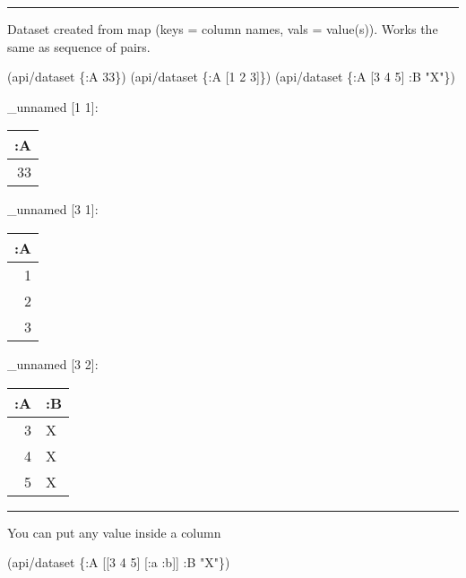 \documentclass[]{article}
\newenvironment{Shaded}{\begin{snugshade}}{\end{snugshade}}
\newcommand{\DecValTok}[1]{\textcolor[rgb]{0.00,0.00,0.81}{#1}}
\newcommand{\StringTok}[1]{\textcolor[rgb]{0.31,0.60,0.02}{#1}}
\newcommand{\AttributeTok}[1]{\textcolor[rgb]{0.77,0.63,0.00}{#1}}
\newcommand{\NormalTok}[1]{#1}
\begin{document}
\begin{center}\rule{0.5\linewidth}{0.5pt}\end{center}

Dataset created from map (keys = column names, vals = value(s)). Works
the same as sequence of pairs.

\begin{Shaded}
\begin{Highlighting}[]
\NormalTok{(api/dataset \{}\AttributeTok{:A} \DecValTok{33}\NormalTok{\})}
\NormalTok{(api/dataset \{}\AttributeTok{:A}\NormalTok{ [}\DecValTok{1} \DecValTok{2} \DecValTok{3}\NormalTok{]\})}
\NormalTok{(api/dataset \{}\AttributeTok{:A}\NormalTok{ [}\DecValTok{3} \DecValTok{4} \DecValTok{5}\NormalTok{] }\AttributeTok{:B} \StringTok{"X"}\NormalTok{\})}
\end{Highlighting}
\end{Shaded}

\_unnamed {[}1 1{]}:

\begin{longtable}[]{@{}r@{}}
\toprule
:A\tabularnewline
\midrule
\endhead
33\tabularnewline
\bottomrule
\end{longtable}

\_unnamed {[}3 1{]}:

\begin{longtable}[]{@{}r@{}}
\toprule
:A\tabularnewline
\midrule
\endhead
1\tabularnewline
2\tabularnewline
3\tabularnewline
\bottomrule
\end{longtable}

\_unnamed {[}3 2{]}:

\begin{longtable}[]{@{}rl@{}}
\toprule
:A & :B\tabularnewline
\midrule
\endhead
3 & X\tabularnewline
4 & X\tabularnewline
5 & X\tabularnewline
\bottomrule
\end{longtable}

\begin{center}\rule{0.5\linewidth}{0.5pt}\end{center}

You can put any value inside a column

\begin{Shaded}
\begin{Highlighting}[]
\NormalTok{(api/dataset \{}\AttributeTok{:A}\NormalTok{ [[}\DecValTok{3} \DecValTok{4} \DecValTok{5}\NormalTok{] [}\AttributeTok{:a} \AttributeTok{:b}\NormalTok{]] }\AttributeTok{:B} \StringTok{"X"}\NormalTok{\})}
\end{Highlighting}
\end{Shaded}
\end{document}
